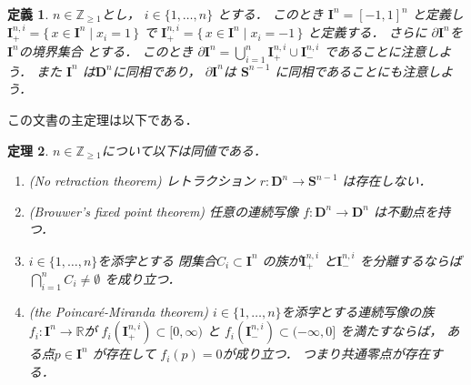 \documentclass[leqno, a4paper, 12pt]{jsarticle}
\newtheorem{thm}{定理}
\newtheorem{df}[thm]{定義}
\newcommand{\zz}{\mathbb{Z}}
\newcommand{\rr}{\mathbb{R}}
\newcommand{\mydisc}[1]{\mathbf{D}^{#1}}
\newcommand{\mysphere}[1]{\mathbf{S}^{#1}}
\newcommand{\mycube}[1]{\mathbf{I}^{n}}
\newcommand{\mycubesidep}[2]{\mathbf{I}^{#1, #2}_{+}}
\newcommand{\mycubesidem}[2]{\mathbf{I}^{#1, #2}_{-}}
\newcommand{\mycubebd}[1]{\partial\mathbf{I}^{n}}
\begin{document}
\begin{df}
$n\in \zz_{\ge 1}$とし，
$i\in \{1, \dots, n\}$
とする．
このとき
$\mycube{n}=[-1, 1]^{n}$
と定義し
$\mycubesidep{n}{i}=\{\, x\in \mycube{n}\mid x_{i}=1\, \}$
で
$\mycubesidep{n}{i}=\{\, x\in \mycube{n}\mid x_{i}=-1\, \}$
と定義する．
さらに
$\mycubebd{n}$を$\mycube{n}$の境界集合
とする．
このとき
$\mycubebd{n}=\bigcup_{i=1}^{n}\mycubesidep{n}{i}\cup \mycubesidem{n}{i}$
であることに注意しよう．
また
$\mycube{n}$
は$\mydisc{n}$に同相であり，
$\mycubebd{n}$は
$\mysphere{n-1}$
に同相であることにも注意しよう．
\end{df}


この文書の主定理は以下である．

\begin{thm}
$n\in \zz_{\ge 1}$について以下は同値である．
\begin{enumerate}[label=\textup{(\arabic*)}]

\item\label{item:noret}(No retraction theorem)
レトラクション
$r\colon \mydisc{n}\to \mysphere{n-1}$
は存在しない．

\item\label{item:fixedpt}(Brouwer's fixed point theorem)
任意の連続写像
$f\colon \mydisc{n}\to \mydisc{n}$
は不動点を持つ．

\item\label{item:ccc}
$i\in \{1, \dots, n\}$を添字とする
閉集合$C_{i}\subset \mycube{n}$
の族が$\mycubesidep{n}{i}$
と$\mycubesidem{n}{i}$
を分離するならば
$\bigcap_{i=1}^{n}C_{i}\neq \emptyset$
を成り立つ．


\item\label{item:pm}(the Poincar\'{e}-Miranda theorem)
$i\in \{1, \dots, n\}$を添字とする連続写像の族
$f_{i}\colon \mycube{n}\to \rr$が
$f_{i}(\mycubesidep{n}{i})\subset [0, \infty)$
と
$f_{i}(\mycubesidem{n}{i})\subset (-\infty, 0]$
を満たすならば，
ある点$p\in \mycube{n}$
が存在して
$f_{i}(p)=0$が成り立つ．
つまり共通零点が存在する．
\end{enumerate}
\end{thm}
\end{document}
